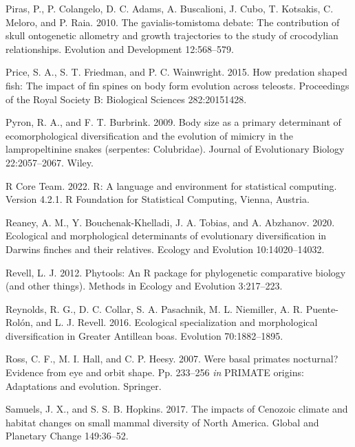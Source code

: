 \documentclass[
  11pt,
]{article}
\begin{document}
\leavevmode\hypertarget{ref-Piras2010}{}%
Piras, P., P. Colangelo, D. C. Adams, A. Buscalioni, J. Cubo, T.
Kotsakis, C. Meloro, and P. Raia. 2010. The gavialis-tomistoma debate:
The contribution of skull ontogenetic allometry and growth trajectories
to the study of crocodylian relationships. Evolution and Development
12:568--579.

\leavevmode\hypertarget{ref-Price2015}{}%
Price, S. A., S. T. Friedman, and P. C. Wainwright. 2015. How predation
shaped fish: The impact of fin spines on body form evolution across
teleosts. Proceedings of the Royal Society B: Biological Sciences
282:20151428.

\leavevmode\hypertarget{ref-PYRON2009}{}%
Pyron, R. A., and F. T. Burbrink. 2009. Body size as a primary
determinant of ecomorphological diversification and the evolution of
mimicry in the lampropeltinine snakes (serpentes: Colubridae). Journal
of Evolutionary Biology 22:2057--2067. Wiley.

\leavevmode\hypertarget{ref-RCT}{}%
R Core Team. 2022. R: A language and environment for statistical
computing. Version 4.2.1. R Foundation for Statistical Computing,
Vienna, Austria.

\leavevmode\hypertarget{ref-Reaney2020}{}%
Reaney, A. M., Y. Bouchenak-Khelladi, J. A. Tobias, and A. Abzhanov.
2020. Ecological and morphological determinants of evolutionary
diversification in Darwins finches and their relatives. Ecology and
Evolution 10:14020--14032.

\leavevmode\hypertarget{ref-Revell2012}{}%
Revell, L. J. 2012. Phytools: An R package for phylogenetic comparative
biology (and other things). Methods in Ecology and Evolution 3:217--223.

\leavevmode\hypertarget{ref-Reynolds2016}{}%
Reynolds, R. G., D. C. Collar, S. A. Pasachnik, M. L. Niemiller, A. R.
Puente-Rolón, and L. J. Revell. 2016. Ecological specialization and
morphological diversification in Greater Antillean boas. Evolution
70:1882--1895.

\leavevmode\hypertarget{ref-2007Ross}{}%
Ross, C. F., M. I. Hall, and C. P. Heesy. 2007. Were basal primates
nocturnal? Evidence from eye and orbit shape. Pp. 233--256 \emph{in}
PRIMATE origins: Adaptations and evolution. Springer.

\leavevmode\hypertarget{ref-SamuelsHopkins2017}{}%
Samuels, J. X., and S. S. B. Hopkins. 2017. The impacts of Cenozoic
climate and habitat changes on small mammal diversity of North America.
Global and Planetary Change 149:36--52.
\end{document}
